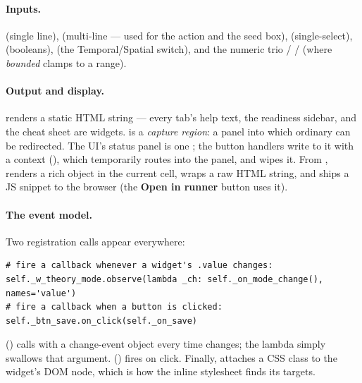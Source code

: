 \paragraph{Inputs.}  (single line),  (multi-line ---
used for the action and the seed box),  (single-select),
 (booleans),  (the Temporal/Spatial
switch), and the numeric trio  /  /
 (where \emph{bounded} clamps to a 
range).

\paragraph{Output and display.}  renders a static HTML
string --- every tab's help text, the readiness sidebar, and the cheat sheet are
 widgets.  is a \emph{capture region}: a panel
into which ordinary  can be redirected. The UI's status panel is
one ; the button handlers write to it with a
 context (), which
temporarily routes  into the panel, and  wipes
it. From ,  renders a rich object in the
current cell,  wraps a raw HTML string, and 
ships a JS snippet to the browser (the \textbf{Open in runner} button uses it).

\paragraph{The event model.} Two registration calls appear everywhere:

\begin{lstlisting}
# fire a callback whenever a widget's .value changes:
self._w_theory_mode.observe(lambda _ch: self._on_mode_change(), names='value')
# fire a callback when a button is clicked:
self._btn_save.on_click(self._on_save)
\end{lstlisting}

 () calls
 with a change-event object every time  changes; the lambda
 simply swallows that argument. 
() fires on click. Finally,
 attaches a CSS class to the widget's DOM node,
which is how the inline  stylesheet finds its targets.


